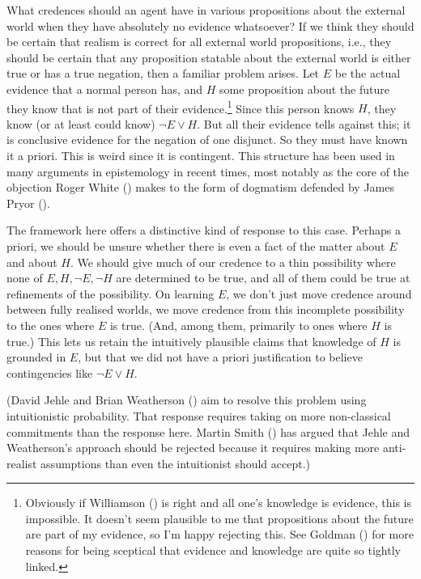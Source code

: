 \documentclass[
  11pt,
  letterpaper,
  DIV=11,
  numbers=noendperiod,
  twoside]{scrartcl}
\newcounter{none} %
\begin{document}
What credences should an agent have in various propositions about the
external world when they have absolutely no evidence whatsoever? If we
think they should be certain that realism is correct for all external
world propositions, i.e., they should be certain that any proposition
statable about the external world is either true or has a true negation,
then a familiar problem arises. Let \(E\) be the actual evidence that a
normal person has, and \(H\) some proposition about the future they know
that is not part of their evidence.\footnote{Obviously if Williamson
  () is right and all one's knowledge
  is evidence, this is impossible. It doesn't seem plausible to me that
  propositions about the future are part of my evidence, so I'm happy
  rejecting this. See Goldman () for
  more reasons for being sceptical that evidence and knowledge are quite
  so tightly linked.} Since this person knows \(H\), they know (or at
least could know) \(\neg E \vee H\). But all their evidence tells
against this; it is conclusive evidence for the negation of one
disjunct. So they must have known it a priori. This is weird since it is
contingent. This structure has been used in many arguments in
epistemology in recent times, most notably as the core of the objection
Roger White () makes to the form of
dogmatism defended by James Pryor ().

The framework here offers a distinctive kind of response to this case.
Perhaps a priori, we should be unsure whether there is even a fact of
the matter about \(E\) and about \(H\). We should give much of our
credence to a thin possibility where none of \(E, H, \neg E, \neg H\)
are determined to be true, and all of them could be true at refinements
of the possibility. On learning \(E\), we don't just move credence
around between fully realised worlds, we move credence from this
incomplete possibility to the ones where \(E\) is true. (And, among
them, primarily to ones where \(H\) is true.) This lets us retain the
intuitively plausible claims that knowledge of \(H\) is grounded in
\(E\), but that we did not have a priori justification to believe
contingencies like \(\neg E \vee H\).

(David Jehle and Brian Weatherson ()
aim to resolve this problem using intuitionistic probability. That
response requires taking on more non-classical commitments than the
response here. Martin Smith () has
argued that Jehle and Weatherson's approach should be rejected because
it requires making more anti-realist assumptions than even the
intuitionist should accept.)
\end{document}
